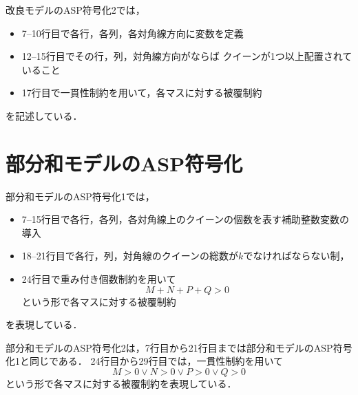 \newpage
改良モデルのASP符号化2では，
\begin{itemize}
 \item 7--10行目で各行，各列，各対角線方向に変数を定義
 \item 12--15行目でその行，列，対角線方向がならば
  クイーンが1つ以上配置されていること
 \item 17行目で一貫性制約を用いて，各マスに対する被覆制約
\end{itemize}
を記述している．

\newpage
\section{部分和モデルのASP符号化}



部分和モデルのASP符号化1では，
\begin{itemize}
 \item 7--15行目で各行，各列，各対角線上のクイーンの個数を表す補助整数変数の導入
 \item 18--21行目で各行，列，対角線のクイーンの総数が$k$でなければならない制， 
 \item 24行目で重み付き個数制約を用いて
	$$M+N+P+Q>0$$
  という形で各マスに対する被覆制約
\end{itemize}
を表現している．

\newpage


部分和モデルのASP符号化2は，7行目から21行目までは部分和モデルのASP符号化1と同じである．
24行目から29行目では，一貫性制約を用いて
$$M>0 \vee N>0 \vee P>0 \vee Q>0$$
という形で各マスに対する被覆制約を表現している．

